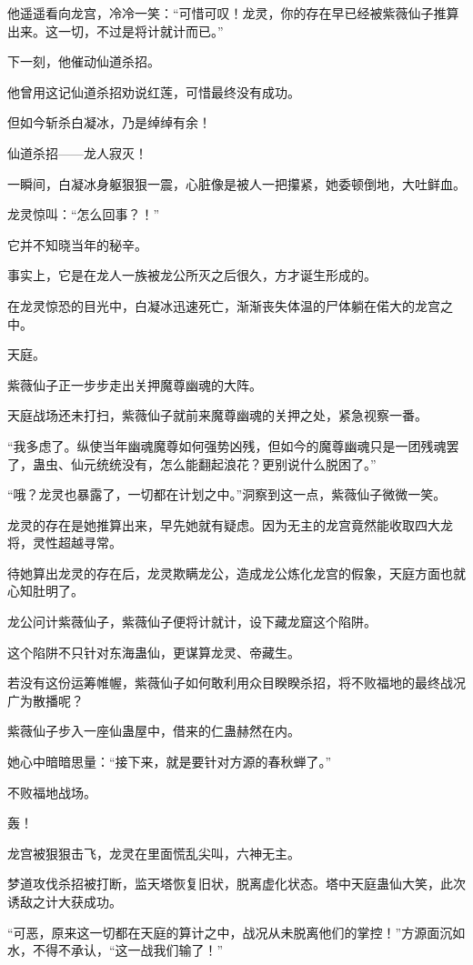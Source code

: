 \begin{this_body}
他遥遥看向龙宫，冷冷一笑：“可惜可叹！龙灵，你的存在早已经被紫薇仙子推算出来。这一切，不过是将计就计而已。”

下一刻，他催动仙道杀招。

他曾用这记仙道杀招劝说红莲，可惜最终没有成功。

但如今斩杀白凝冰，乃是绰绰有余！

仙道杀招——龙人寂灭！

一瞬间，白凝冰身躯狠狠一震，心脏像是被人一把攥紧，她委顿倒地，大吐鲜血。

龙灵惊叫：“怎么回事？！”

它并不知晓当年的秘辛。

事实上，它是在龙人一族被龙公所灭之后很久，方才诞生形成的。

在龙灵惊恐的目光中，白凝冰迅速死亡，渐渐丧失体温的尸体躺在偌大的龙宫之中。

天庭。

紫薇仙子正一步步走出关押魔尊幽魂的大阵。

天庭战场还未打扫，紫薇仙子就前来魔尊幽魂的关押之处，紧急视察一番。

“我多虑了。纵使当年幽魂魔尊如何强势凶残，但如今的魔尊幽魂只是一团残魂罢了，蛊虫、仙元统统没有，怎么能翻起浪花？更别说什么脱困了。”

“哦？龙灵也暴露了，一切都在计划之中。”洞察到这一点，紫薇仙子微微一笑。

龙灵的存在是她推算出来，早先她就有疑虑。因为无主的龙宫竟然能收取四大龙将，灵性超越寻常。

待她算出龙灵的存在后，龙灵欺瞒龙公，造成龙公炼化龙宫的假象，天庭方面也就心知肚明了。

龙公问计紫薇仙子，紫薇仙子便将计就计，设下藏龙窟这个陷阱。

这个陷阱不只针对东海蛊仙，更谋算龙灵、帝藏生。

若没有这份运筹帷幄，紫薇仙子如何敢利用众目睽睽杀招，将不败福地的最终战况广为散播呢？

紫薇仙子步入一座仙蛊屋中，借来的仁蛊赫然在内。

她心中暗暗思量：“接下来，就是要针对方源的春秋蝉了。”

不败福地战场。

轰！

龙宫被狠狠击飞，龙灵在里面慌乱尖叫，六神无主。

梦道攻伐杀招被打断，监天塔恢复旧状，脱离虚化状态。塔中天庭蛊仙大笑，此次诱敌之计大获成功。

“可恶，原来这一切都在天庭的算计之中，战况从未脱离他们的掌控！”方源面沉如水，不得不承认，“这一战我们输了！”


\end{this_body}
